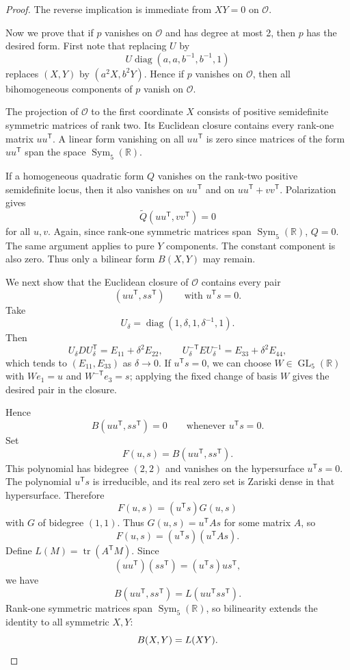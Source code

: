 \documentclass[11pt]{amsart}
\theoremstyle{remark}
\DeclareMathOperator{\Sym}{Sym}
\DeclareMathOperator{\GL}{GL}
\DeclareMathOperator{\diag}{diag}
\DeclareMathOperator{\tr}{tr}
\newcommand{\tp}{{\scriptscriptstyle\mathsf{T}}}
\begin{document}
\begin{proof}
The reverse implication is immediate from $XY=0$ on $\mathcal O$.

Now we prove that if $p$ vanishes on $\mathcal O$ and has degree at most 2, then $p$ has the desired form. First note that replacing $U$ by
\[
U\diag(a,a,b^{-1},b^{-1},1)
\]
replaces $(X,Y)$ by $(a^2X,b^2Y)$. Hence if $p$ vanishes on $\mathcal O$, then all bihomogeneous components of $p$ vanish on $\mathcal O$.

The projection of $\mathcal O$ to the first coordinate $X$ consists of positive semidefinite symmetric matrices of rank two. Its Euclidean closure contains every rank-one matrix $uu^\tp $. A linear form vanishing on all $uu^\tp $ is zero since matrices of the form $uu^\tp $ span the space $\Sym_5(\mathbb{R})$.

If a homogeneous quadratic form $Q$ vanishes on the rank-two positive semidefinite locus, then it also vanishes on $uu^\tp $ and on $uu^\tp +vv^\tp $. Polarization gives
\[
\widetilde Q(uu^\tp ,vv^\tp )=0
\]
for all $u,v$. Again, since rank-one symmetric matrices span $\Sym_5(\mathbb R)$, $Q=0$. The same argument applies to pure $Y$ components. The constant component is also zero. Thus only a bilinear form $B(X,Y)$ may remain.

We next show that the Euclidean closure of $\mathcal O$ contains every pair
\[
(uu^\tp ,ss^\tp )\qquad\text{with }u^\tp s=0.
\]
Take
\[
U_\delta=\diag(1,\delta,1,\delta^{-1},1).
\]
Then
\[
U_\delta DU_\delta^\tp =E_{11}+\delta^2E_{22},
\qquad
U_\delta^{-\tp} EU_\delta^{-1}=E_{33}+\delta^2E_{44},
\]
which tends to $(E_{11},E_{33})$ as $\delta \to 0$. If $u^\tp s=0$, we can choose $W\in\GL_5(\mathbb R)$ with $We_1=u$ and $W^{-\tp} e_3=s$; applying the fixed change of basis $W$ gives the desired pair in the closure.

Hence
\[
B(uu^\tp ,ss^\tp )=0\qquad\text{whenever }u^\tp s=0.
\]
Set
\[
F(u,s)=B(uu^\tp ,ss^\tp ).
\]
This polynomial has bidegree $(2,2)$ and vanishes on the hypersurface $u^\tp s=0$. The polynomial $u^\tp s$ is irreducible, and its real zero set is Zariski dense in that hypersurface. Therefore
\[
F(u,s)=(u^\tp s)G(u,s)
\]
with $G$ of bidegree $(1,1)$. Thus $G(u,s)=u^\tp As$ for some matrix $A$, so
\[
F(u,s)=(u^\tp s)(u^\tp As).
\]
Define $L(M)=\tr(A^\tp M)$. Since
\[
(uu^\tp )(ss^\tp )=(u^\tp s)us^\tp ,
\]
we have
\[
B(uu^\tp ,ss^\tp )=L(uu^\tp ss^\tp ).
\]
Rank-one symmetric matrices span $\Sym_5(\mathbb R)$, so bilinearity extends the identity to all symmetric $X,Y$:
\[
B(X,Y)=L(XY). \qedhere
\]
\end{proof}
\end{document}
